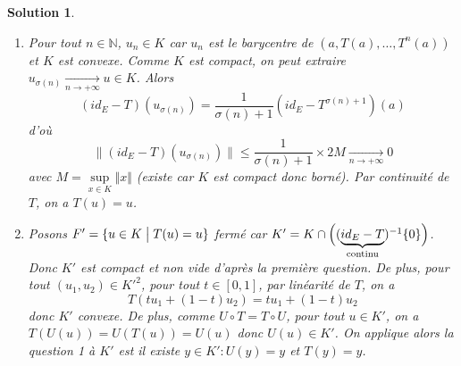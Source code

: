 \documentclass[12pt]{article}
\newtheorem{solution}{Solution}[section]
\theoremstyle{remark}
\newcommand{\N}{\mathbb{N}} \newcommand{\Z}{\mathbb{Z}}
\numberwithin{equation}{section}
\begin{document}
\begin{solution}
	\phantom{}
	\begin{enumerate}
		\item Pour tout $n\in\N$, $u_{n}\in K$ car $u_{n}$ est le barycentre de $(a,T(a),\dots,T^{n}(a))$ et $K$ est convexe. Comme $K$ est compact, on peut extraire $u_{\sigma(n)}\xrightarrow[n\to+\infty]{}u\in K$. Alors
		$$(id_{E}-T)(u_{\sigma(n)})=\frac{1}{\sigma(n)+1}(id_{E}-T^{\sigma(n)+1})(a)$$
		d'où 
		$$\rVert(id_{E}-T)(u_{\sigma(n)})\lVert\leqslant\frac{1}{\sigma(n)+1}\times 2M\xrightarrow[n\to+\infty]{}0$$
		avec $M=\sup\limits_{x\in K}\Vert x\Vert$ (existe car $K$ est compact donc borné). Par continuité de $T$, on a $T(u)=u$.

		\item Posons $F'=\{u\in K\bigm| T(u)=u\}$ fermé car $K'=K\cap\Bigl((\underbrace{id_{E}-T}_{\text{continu}})^{-1}\{0\}\Bigr)$.
		Donc $K'$ est compact et non vide d'après la première question. De plus, pour tout $(u_{1},u_{2})\in K'^{2}$, pour tout $t\in[0,1]$, par linéarité de $T$, on a 
		$$T(tu_{1}+(1-t)u_{2})=tu_{1}+(1-t)u_{2}$$
		donc $K'$ convexe. De plus, comme $U\circ T=T\circ U$, pour tout $u\in K'$, on a $T(U(u))=U(T(u))=U(u)$ donc $U(u)\in K'$. On applique alors la question 1 à $K'$ est il existe $y\in K'\colon U(y)=y$ et $T(y)=y$.
	\end{enumerate}
\end{solution}
\end{document}
